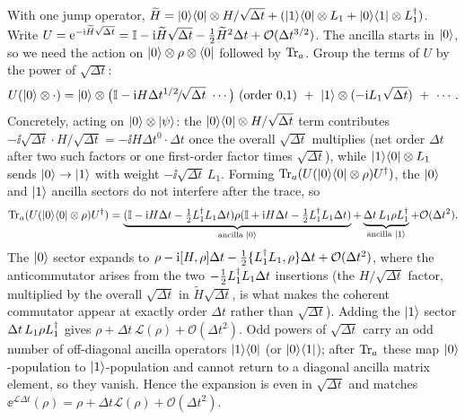 \begin{solution}
With one jump operator, $\widetilde H=\ket{0}\!\bra{0}\otimes H/\sqrt{\Delta t}+(\ket1\!\bra0\otimes L_1
+\ket0\!\bra1\otimes L_1^{\dagger})$. Write $U=\mathrm{e}^{-\mathrm{i}\widetilde H\sqrt{\Delta t}}=\mathbb{I}-\mathrm{i}\widetilde H
\sqrt{\Delta t}-\tfrac12\widetilde H^2\Delta t+\mathcal O(\Delta t^{3/2})$. The ancilla starts in
$\ket0$, so we need the action on $\ket0\otimes\rho\otimes\bra0$ followed by $\operatorname{Tr}_a$. Group the
terms of $U$ by the power of $\sqrt{\Delta t}$:
\[
  U(\ket0\otimes\cdot)=\ket0\otimes\bigl(\id-\ii H\Delta t^{1/2}\!/\!\sqrt{\Delta t}\ \cdots\bigr)
  \ \text{(order 0,1)}\ +\ \ket1\otimes(-\ii L_1\sqrt{\Delta t})\ +\ \cdots.
\]
Concretely, acting on $\ket0\otimes\ket\psi$: the $\ket{0}\!\bra{0}\otimes H/\sqrt{\Delta t}$ term
contributes $-\ii\sqrt{\Delta t}\cdot H/\sqrt{\Delta t}=-\ii H\Delta t^0\cdot\Delta t$ once the
overall $\sqrt{\Delta t}$ multiplies (net order $\Delta t$ after two such factors or one first-order
factor times $\sqrt{\Delta t}$), while $\ket1\!\bra0\otimes L_1$ sends $\ket0\to\ket1$ with weight
$-\ii\sqrt{\Delta t}\,L_1$. Forming $\operatorname{Tr}_a(U(\ket{0}\!\bra{0}\otimes\rho)U^{\dagger})$, the $\ket0$ and $\ket1$
ancilla sectors do not interfere after the trace, so
\[
  \operatorname{Tr}_a(U(\ket{0}\!\bra{0}\otimes\rho)U^{\dagger})
  =\underbrace{(\mathbb{I}-\mathrm{i} H\Delta t-\tfrac12 L_1^{\dagger} L_1\Delta t)\rho(\mathbb{I}+\mathrm{i} H\Delta t-\tfrac12
    L_1^{\dagger} L_1\Delta t)}_{\text{ancilla }\ket0}
  +\underbrace{\Delta t\,L_1\rho L_1^{\dagger}}_{\text{ancilla }\ket1}+\mathcal O(\Delta t^2).
\]
The $\ket0$ sector expands to $\rho-\mathrm{i}[H,\rho]\Delta t-\tfrac12\{L_1^{\dagger} L_1,\rho\}\Delta t
+\mathcal O(\Delta t^2)$, where the anticommutator arises from the two $-\tfrac12 L_1^{\dagger} L_1
\Delta t$ insertions (the $H/\sqrt{\Delta t}$ factor, multiplied by the overall $\sqrt{\Delta t}$
in $\widetilde H\sqrt{\Delta t}$, is what makes the coherent commutator appear at exactly order
$\Delta t$ rather than $\sqrt{\Delta t}$). Adding the $\ket1$ sector $\Delta t\,L_1\rho L_1^{\dagger}$
gives $\rho+\Delta t\,\mathcal L(\rho)+\mathcal O(\Delta t^2)$. Odd powers of $\sqrt{\Delta t}$
carry an odd number of off-diagonal ancilla operators $\ket1\!\bra0$ (or $\ket0\!\bra1$); after
$\operatorname{Tr}_a$ these map $\ket0$-population to $\ket1$-population and cannot return to a diagonal ancilla
matrix element, so they vanish. Hence the expansion is even in $\sqrt{\Delta t}$ and matches
$\ee^{\mathcal L\Delta t}(\rho)=\rho+\Delta t\mathcal L(\rho)+\mathcal O(\Delta t^2)$.
\end{solution}


